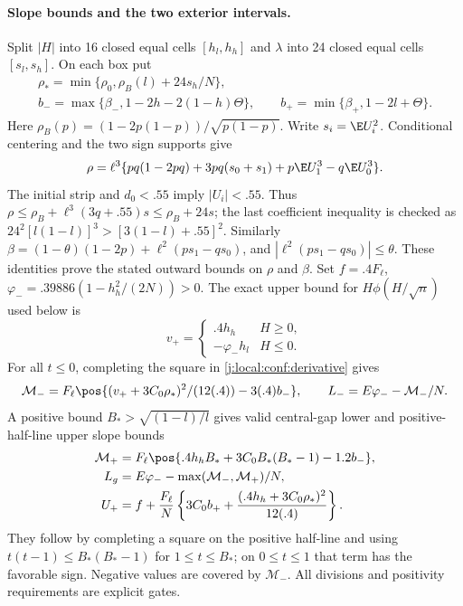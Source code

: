 \paragraph{Slope bounds and the two exterior intervals.}
Split $|H|$ into 16 closed equal cells $[h_l,h_h]$ and $\lambda$ into
24 closed equal cells $[s_l,s_h]$. On each box put
\[
 \begin{gathered}
 \rho_* =\min\{\rho_0,\rho_B(l)+24s_h/N\},\\
 b_- =\max\{\beta_-,1-2h-2(1-h)\Theta\},\qquad
 b_+ =\min\{\beta_+,1-2l+\Theta\}.
 \end{gathered}
\]
Here $\rho_B(p)=(1-2p(1-p))/\sqrt{p(1-p)}$. Write $s_i=\E U_i^2$. Conditional centering and the two sign supports give
\[
 \rho=\ell^3\{pq(1-2pq)+3pq(s_0+s_1)
                  +p\E U_1^3-q\E U_0^3\}.
\]
The initial strip and $d_0<.55$ imply $|U_i|<.55$.
Thus $\rho\le\rho_B+\ell^3(3q+.55)s\le\rho_B+24s$; the last
coefficient inequality is checked as
$24^2[l(1-l)]^3>[3(1-l)+.55]^2$.
Similarly $\beta=(1-\theta)(1-2p)+\ell^2(ps_1-qs_0)$, and
$|\ell^2(ps_1-qs_0)|\le\theta$. These identities prove the stated
outward bounds on $\rho$ and $\beta$.
Set $f=.4F_\ell$, $\varphi_-=.39886(1-h_h^2/(2N))>0$.
The exact upper bound for $H\phi(H/\sqrt n)$ used below is
\[
 v_+=\begin{cases}.4h_h&H\ge0,\\-\varphi_-h_l&H\le0.\end{cases}
\]
For all $t\le0$, completing the square in \eqref{j:local:conf:derivative} gives
\[
 \mathcal M_-=F_\ell\pos{(v_++3C_0\rho_*)^2/(12(.4))-3(.4)b_-},
 \qquad L_-=E\varphi_- -\mathcal M_-/N.
\]
A positive bound $B_*>\sqrt{(1-l)/l}$ gives valid central-gap lower
and positive-half-line upper slope bounds
\begin{align*}
 \mathcal M_+&=F_\ell\pos{.4h_hB_*+3C_0B_*(B_*-1)-1.2b_-},\\
 L_g&=E\varphi_--\max(\mathcal M_-,\mathcal M_+)/N,\\
 U_+&=f+\frac{F_\ell}{N}
 \left\{3C_0b_++\frac{(.4h_h+3C_0\rho_*)^2}{12(.4)}\right\}.
\end{align*}
They follow by completing a square on the positive half-line and using
$t(t-1)\le B_*(B_*-1)$ for $1\le t\le B_*$; on $0\le t\le1$ that
term has the favorable sign. Negative values are covered by $\mathcal M_-$.
All divisions and positivity requirements are explicit gates.

